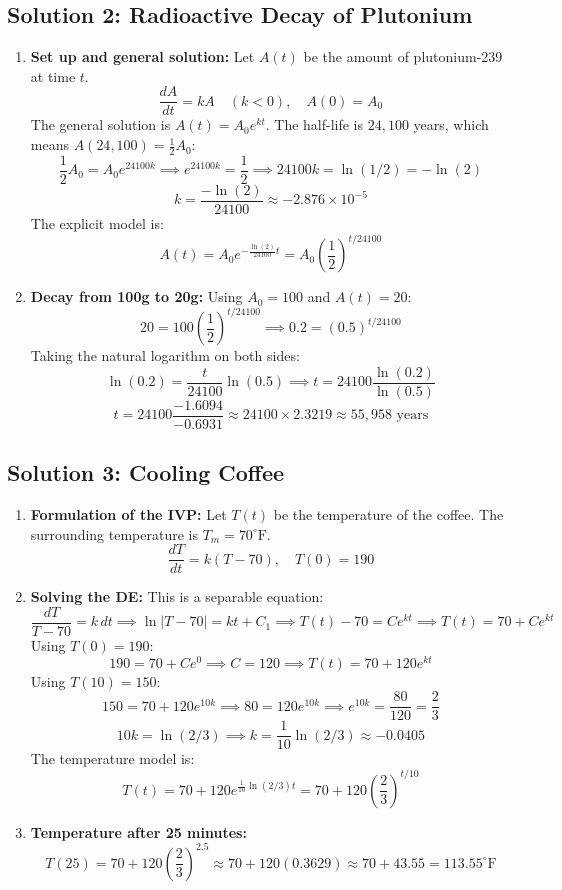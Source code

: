 \documentclass[11pt,letterpaper]{article}
\begin{document}
\subsection*{Solution 2: Radioactive Decay of Plutonium}
\begin{enumerate}[label=(\alph*)]
    \item \textbf{Set up and general solution:}
    Let $A(t)$ be the amount of plutonium-239 at time $t$.
    \[ \frac{dA}{dt} = kA \quad (k < 0), \quad A(0) = A_0 \]
    The general solution is $A(t) = A_0 e^{kt}$. 
    The half-life is $24,100$ years, which means $A(24,100) = \frac{1}{2}A_0$:
    \[ \frac{1}{2}A_0 = A_0 e^{24100 k} \implies e^{24100 k} = \frac{1}{2} \implies 24100 k = \ln(1/2) = -\ln(2) \]
    \[ k = \frac{-\ln(2)}{24100} \approx -2.876 \times 10^{-5} \]
    The explicit model is:
    \[ A(t) = A_0 e^{-\frac{\ln(2)}{24100}t} = A_0 \left(\frac{1}{2}\right)^{t/24100} \]

    \item \textbf{Decay from 100g to 20g:}
    Using $A_0 = 100$ and $A(t) = 20$:
    \[ 20 = 100 \left(\frac{1}{2}\right)^{t/24100} \implies 0.2 = (0.5)^{t/24100} \]
    Taking the natural logarithm on both sides:
    \[ \ln(0.2) = \frac{t}{24100} \ln(0.5) \implies t = 24100 \frac{\ln(0.2)}{\ln(0.5)} \]
    \[ t = 24100 \frac{-1.6094}{-0.6931} \approx 24100 \times 2.3219 \approx 55,958 \text{ years} \]
\end{enumerate}

\subsection*{Solution 3: Cooling Coffee}
\begin{enumerate}[label=(\alph*)]
    \item \textbf{Formulation of the IVP:}
    Let $T(t)$ be the temperature of the coffee. The surrounding temperature is $T_m = 70^\circ\text{F}$.
    \[ \frac{dT}{dt} = k(T - 70), \quad T(0) = 190 \]

    \item \textbf{Solving the DE:}
    This is a separable equation:
    \[ \frac{dT}{T-70} = k \, dt \implies \ln|T-70| = kt + C_1 \implies T(t) - 70 = C e^{kt} \implies T(t) = 70 + C e^{kt} \]
    Using $T(0) = 190$:
    \[ 190 = 70 + C e^0 \implies C = 120 \implies T(t) = 70 + 120 e^{kt} \]
    Using $T(10) = 150$:
    \[ 150 = 70 + 120 e^{10k} \implies 80 = 120 e^{10k} \implies e^{10k} = \frac{80}{120} = \frac{2}{3} \]
    \[ 10k = \ln(2/3) \implies k = \frac{1}{10}\ln(2/3) \approx -0.0405 \]
    The temperature model is:
    \[ T(t) = 70 + 120 e^{\frac{1}{10}\ln(2/3)t} = 70 + 120 \left(\frac{2}{3}\right)^{t/10} \]

    \item \textbf{Temperature after 25 minutes:}
    \[ T(25) = 70 + 120 \left(\frac{2}{3}\right)^{2.5} \approx 70 + 120 (0.3629) \approx 70 + 43.55 = 113.55^\circ\text{F} \]
\end{enumerate}
\end{document}
